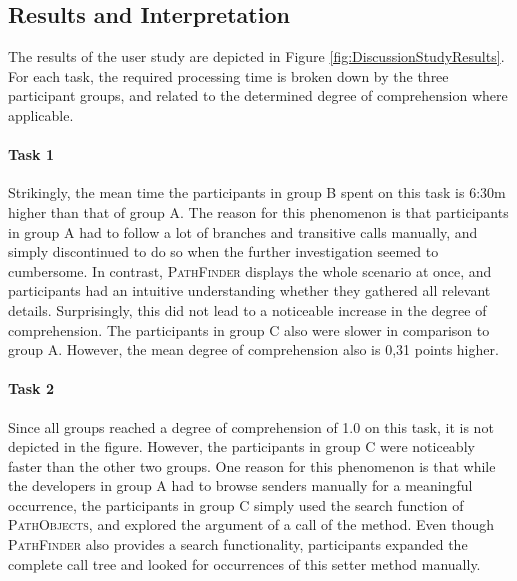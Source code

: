 \subsection{Results and Interpretation}
The results of the user study are depicted in Figure \ref{fig:DiscussionStudyResults}.
For each task, the required processing time is broken down by the three participant groups, and related to the determined degree of comprehension where applicable.

\paragraph{Task 1} Strikingly, the mean time the participants in group B spent on this task is 6:30m higher than that of group A.
The reason for this phenomenon is that participants in group A had to follow a lot of branches and transitive calls manually, and simply discontinued to do so when the further investigation seemed to cumbersome.
In contrast, \textsc{PathFinder} displays the whole scenario at once, and participants had an intuitive understanding whether they gathered all relevant details.
Surprisingly, this did not lead to a noticeable increase in the degree of comprehension.
The participants in group C also were slower in comparison to group A.
However, the mean degree of comprehension also is 0,31 points higher.

\paragraph{Task 2} Since all groups reached a degree of comprehension of 1.0 on this task, it is not depicted in the figure.
However, the participants in group C were noticeably faster than the other two groups. 
One reason for this phenomenon is that while the developers in group A had to browse senders manually for a meaningful occurrence, the participants in group C simply used the search function of \textsc{PathObjects}, and explored the argument of a call of the  method.
Even though \textsc{PathFinder} also provides a search functionality, participants expanded the complete call tree and looked for occurrences of this setter method manually.

